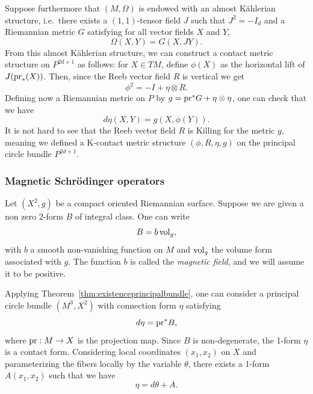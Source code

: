 \documentclass[12pt,a4paper]{amsart}
\theoremstyle{plain}
\theoremstyle{definition}
\theoremstyle{remark}
\numberwithin{equation}{section}
\theoremstyle{definition}
\def \pr{{\rm pr}}
\numberwithin{equation}{section}
\begin{document}
Suppose furthermore that $(M,\Omega)$ is endowed with an almost Kählerian structure, i.e.~there exists a $(1,1)$-tensor field $J$ such that $J^2 = -I_{d}$ and a Riemannian metric $G$ satisfying for all vector fields $X$ and $Y$,
\begin{equation*}
    \Omega(X,Y) = G(X,JY).
\end{equation*}
From this almost Kählerian structure, we can construct a contact metric structure on $P^{2d+1}$ as follows: for $X\in TM$, define $\phi(X)$ as the horizontal lift of $J(\pr_{*}(X))$. Then, since the Reeb vector field $R$ is vertical we get 
\begin{equation*}
    \phi^2 = -I + \eta \otimes R.
\end{equation*}
Defining now a Riemannian metric on $P$ by $g = \pr^{*} G + \eta \otimes \eta$, one can check that we have 
\begin{equation*}
    d\eta(X,Y) = g(X,\phi(Y)).
\end{equation*}
It is not hard to see that the Reeb vector field $R$ is Killing for the metric $g$, meaning we defined a K-contact metric structure $(\phi,R,\eta,g)$ on the principal circle bundle $P^{2d+1}$.

\subsubsection{Magnetic Schrödinger operators} Let $(X^2,g)$ be a compact oriented Riemannian surface. Suppose we are given a non zero 2-form $B$ of integral class. One can write 
\begin{equation*}
    B = b\, {\rm vol}_g,
\end{equation*}
with $b$ a smooth non-vanishing function on $M$ and ${\rm vol}_g$ the volume form associated with $g$. The function $b$ is called the \emph{magnetic field}, and we will assume it to be positive.

Applying Theorem~\ref{thm:existenceprincipalbundle}, one can consider a principal circle bundle $(M^3,X^2)$ with connection form $\eta$ satisfying 
\begin{equation*}
    d\eta = \pr^* B,
\end{equation*}
where $\pr:M\rightarrow X$ is the projection map. Since $B$ is non-degenerate, the 1-form $\eta$ is a contact form. Considering local coordinates $(x_1,x_2)$ on $X$ and parameterizing the fibers locally by the variable $\theta$, there exists a 1-form $A(x_1,x_2)$  such that we have
\begin{equation*}
    \eta = d\theta + A.
\end{equation*}
\end{document}
